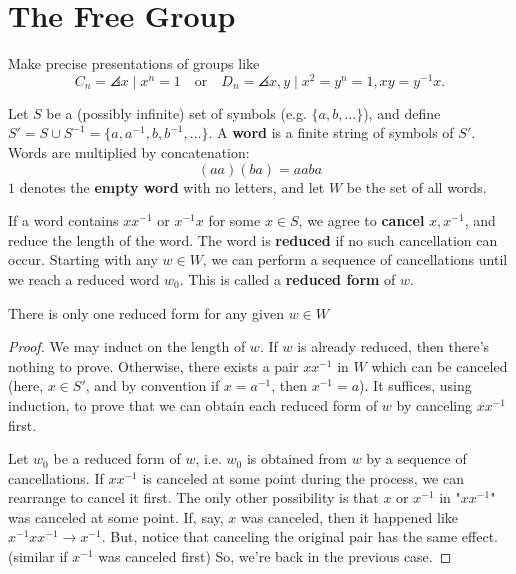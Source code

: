 \section{The Free Group}

\begin{notebox*}[Motivation]
    Make precise presentations of groups like
    $$C_n=\angles{x \mid x^n=1} \quad \text{or} \quad D_n = \angles{x,y\mid x^2=y^n=1,xy=y^{-1}x}.$$
\end{notebox*}

\begin{defn}[Words]
    Let $S$ be a (possibly infinite) set of symbols (e.g. $\{a,b,\dots\}$), and define $S'=S\cup S^{-1}=\{a,a^{-1},b,b^{-1},\dots\}$. A \textbf{word} is a finite string of symbols of $S'$. Words are multiplied by concatenation:
    $$(aa)(ba)=aaba$$
    $1$ denotes the \textbf{empty word} with no letters, and let $W$ be the set of all words.

    If a word contains $xx^{-1}$ or $x^{-1}x$ for some $x \in S$, we agree to \textbf{cancel} $x,x^{-1}$, and reduce the length of the word. The word is \textbf{reduced} if no such cancellation can occur. Starting with any $w \in W$, we can perform a sequence of cancellations until we reach a reduced word $w_0$. This is called a \textbf{reduced form} of $w$.
\end{defn}

\begin{prop}
    There is only one reduced form for any given $w \in W$
\end{prop}

\begin{proof}
    We may induct on the length of $w$. If $w$ is already reduced, then there's nothing to prove. Otherwise, there exists a pair $xx^{-1}$ in $W$ which can be canceled (here, $x \in S'$, and by convention if $x = a^{-1}$, then $x^{-1}=a$). It suffices, using induction, to prove that we can obtain each reduced form of $w$ by canceling $xx^{-1}$ first.

    Let $w_0$ be a reduced form of $w$, i.e. $w_0$ is obtained from $w$ by a sequence of cancellations. If $xx^{-1}$ is canceled at some point during the process, we can rearrange to cancel it first. The only other possibility is that $x$ or $x^{-1}$ in "$xx^{-1}$" was canceled at some point. If, say, $x$ was canceled, then it happened like $x^{-1}xx^{-1} \to x^{-1}$. But, notice that canceling the original pair has the same effect. (similar if $x^{-1}$ was canceled first) So, we're back in the previous case.
\end{proof}

